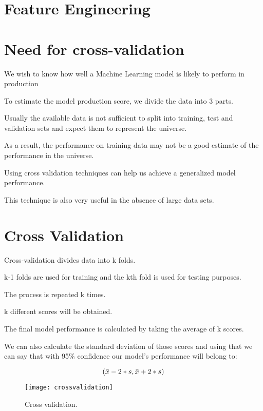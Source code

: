 	\section{Feature Engineering}
	

	\section{Need for cross-validation}
	\begin{bulletedlist}
		\item We wish to know how well a Machine Learning model is likely to perform in production
		\item To estimate the model production score, we divide the data into 3 parts.
		\item Usually the available data is not sufficient to split into training, test and validation sets and expect them to represent the universe.
		\item As a result, the performance on training data may not be a good estimate of the performance in the universe.
		\item Using cross validation techniques can help us achieve a generalized model performance.
		\item This technique is also very useful in the absence of large data sets.
	\end{bulletedlist}

	\section{Cross Validation}
	\begin{bulletedlist}
		\item Cross-validation divides data into k folds.
		\item k-1 folds are used for training and the kth fold is used for testing purposes.
		\item The process is repeated k times.
		\item k different scores will be obtained.
		\item The final model performance is calculated by taking the average of k scores.
		\item We can also calculate the standard deviation of those scores and using that we can say that with 95\% confidence our model's performance will belong to:
	\end{bulletedlist}
	\begin{equation}
		\left(\mbox{$\bar{x}$} - 2*\mbox{$s$}{}, \mbox{$\bar{x}$} + 2*\mbox{$s$}{}\right)
	\end{equation}
	\begin{figure}[htb]
		\centering
		\texttt{[image: crossvalidation]}
		\caption[Cross validation]{Cross validation.}
		\label{fig:crossvalidation}
	\end{figure}


